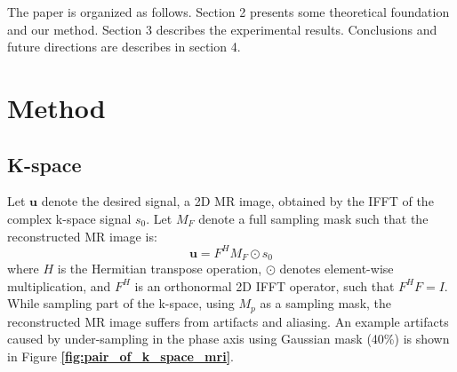 \documentclass[review]{elsarticle}
\begin{document}
The paper is organized as follows. Section 2 presents some theoretical
foundation and our method. Section 3 describes the experimental results.
Conclusions and future directions are describes in section 4.

\section{Method}

\subsection{K-space}
Let $\bm{u}$ denote the desired signal, a 2D MR image, obtained
by the IFFT of the complex k-space signal $s_{0}$. Let $M_{F}$ denote
a full sampling mask such that the reconstructed MR image is: 
\begin{equation}
\bm{u}=F^{H}M_{F}\odot s_{0}
\end{equation}
where $H$ is the Hermitian transpose operation, $\odot$ denotes
element-wise multiplication, and $F^{H}$ is an orthonormal 2D IFFT
operator, such that $F^{H}F=I$. While sampling part of the k-space,
using $M_{p}$ as a sampling mask, the reconstructed MR image suffers
from artifacts and aliasing. An example artifacts caused by under-sampling in the phase axis using Gaussian mask (40\%)
is shown in Figure \textbf{\ref{fig:pair_of_k_space_mri}}.
\end{document}
